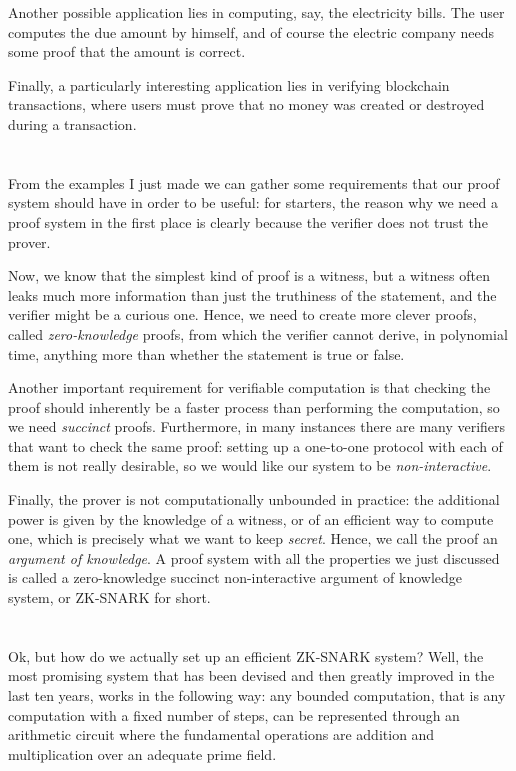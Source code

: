 \documentclass{article}
\begin{document}
Another possible application lies in computing, say, the electricity bills. 
The user computes the due amount by himself, and of course the electric company needs some proof 
that the amount is correct.  

Finally, a particularly interesting application lies in verifying blockchain transactions, where 
users must prove that no money was created or destroyed during a transaction.

\section{}
From the examples I just made we can gather some requirements that our proof system should 
have in order to be useful: for starters, the reason why we need a proof system in the first place 
is clearly because the verifier does not trust the prover.

Now, we know that the simplest kind of proof is a witness, but a witness often leaks 
much more information than just the truthiness of the statement, and the verifier might be a 
curious one.
Hence, we need to create more clever proofs, called \emph{zero-knowledge} proofs, from which the 
verifier cannot derive, in polynomial time, anything more than whether the statement is true or 
false.

Another important requirement for verifiable computation is that checking the proof should 
inherently be a faster process than performing the computation, so we need \emph{succinct} proofs.
Furthermore, in many instances there are many verifiers that want to check the same proof: setting 
up a one-to-one protocol with each of them is not really desirable, so we would like our system 
to be \emph{non-interactive}.

Finally, the prover is not computationally unbounded in practice: the 
additional power is given by the knowledge of a witness, or of an efficient way to compute one,
which is precisely what we want to keep \emph{secret}. 
Hence, we call the proof an \emph{argument of knowledge}.
A proof system with all the properties we just discussed is called a zero-knowledge succinct 
non-interactive argument of knowledge system, or ZK-SNARK for short.

\section{}
Ok, but how do we actually set up an efficient ZK-SNARK system?
Well, the most promising system that has been devised and then greatly improved in the last ten 
years, works in the following way: any bounded computation, that is any computation with a fixed 
number of steps, can be represented through an arithmetic circuit where the fundamental operations 
are addition and multiplication over an adequate prime field.
\end{document}
